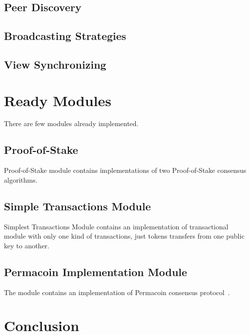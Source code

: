 \documentclass[]{report}   %
\begin{document}
\subsection{Peer Discovery}

\subsection{Broadcasting Strategies}

\subsection{View Synchronizing}

\section{Ready Modules}
There are few modules already implemented.

\subsection{Proof-of-Stake}
Proof-of-Stake module contains implementations of two Proof-of-Stake consensus algorithms. 

\subsection{Simple Transactions Module}

Simplest Transactions Module contains an implementation of transactional module with only one kind of transactions, just tokens transfers from one public key to another.

\subsection{Permacoin Implementation Module}

The module contains an implementation of Permacoin consensus protocol~\cite{miller2014permacoin}.

\section{Conclusion}



\end{document}
